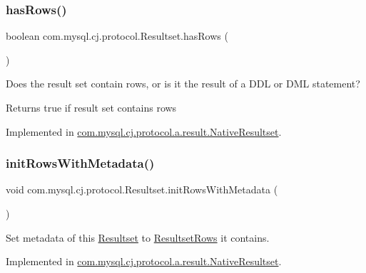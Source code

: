 \subsubsection{\texorpdfstring{has\+Rows()}{hasRows()}}
{\footnotesize\ttfamily boolean com.\+mysql.\+cj.\+protocol.\+Resultset.\+has\+Rows (\begin{DoxyParamCaption}{ }\end{DoxyParamCaption})}

Does the result set contain rows, or is it the result of a D\+DL or D\+ML statement?

\begin{DoxyReturn}{Returns}
true if result set contains rows 
\end{DoxyReturn}


Implemented in \mbox{\hyperlink{classcom_1_1mysql_1_1cj_1_1protocol_1_1a_1_1result_1_1_native_resultset_a6873a98d8b78925b9260230838d280d2}{com.\+mysql.\+cj.\+protocol.\+a.\+result.\+Native\+Resultset}}.

\mbox{\label{interfacecom_1_1mysql_1_1cj_1_1protocol_1_1_resultset_a2ee6b6a8cb5164dfc293b23cefb96b46}} 
\subsubsection{\texorpdfstring{init\+Rows\+With\+Metadata()}{initRowsWithMetadata()}}
{\footnotesize\ttfamily void com.\+mysql.\+cj.\+protocol.\+Resultset.\+init\+Rows\+With\+Metadata (\begin{DoxyParamCaption}{ }\end{DoxyParamCaption})}

Set metadata of this \mbox{\hyperlink{interfacecom_1_1mysql_1_1cj_1_1protocol_1_1_resultset}{Resultset}} to \mbox{\hyperlink{interfacecom_1_1mysql_1_1cj_1_1protocol_1_1_resultset_rows}{Resultset\+Rows}} it contains. 

Implemented in \mbox{\hyperlink{classcom_1_1mysql_1_1cj_1_1protocol_1_1a_1_1result_1_1_native_resultset_a55681e1e25bdf8a26e098f812979bec3}{com.\+mysql.\+cj.\+protocol.\+a.\+result.\+Native\+Resultset}}.

\mbox{\label{interfacecom_1_1mysql_1_1cj_1_1protocol_1_1_resultset_aee8797446404a63565e56825f2b5a5d4}} 
